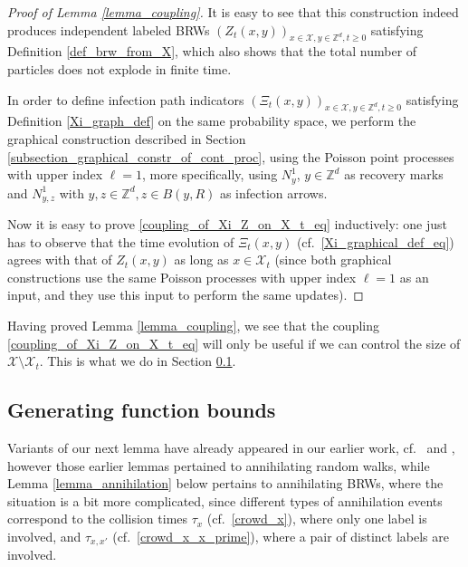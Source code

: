 \documentclass[a4paper,12pt]{article}
\begin{document}
\begin{proof}[Proof of Lemma \ref{lemma_coupling}]
\smallskip

It is easy to see that this construction indeed produces independent labeled BRWs  $(Z_t(x,y))_{x \in \mathcal{X},y \in \mathbb{Z}^d, t \geq 0}$ satisfying Definition \ref{def_brw_from_X}, which
also shows that the total number of particles does not explode in finite time.


\smallskip

 In order to define infection path indicators $(\Xi_t(x,y))_{x \in \mathcal{X},y \in \mathbb{Z}^d, t \geq 0}$ satisfying Definition \ref{Xi_graph_def} on the same probability space, we perform the graphical
 construction described in Section \ref{subsection_graphical_constr_of_cont_proc}, using the Poisson point processes with upper index $\ell=1$, more specifically, using  $N^{1}_y$, $y \in \mathbb{Z}^d$ as recovery marks and
 $N^{1}_{y,z}$ with $y,z \in \mathbb{Z}^d, z \in B(y,R)$ as infection arrows.

 \smallskip

 Now it is easy to prove \eqref{coupling_of_Xi_Z_on_X_t_eq} inductively: one just has to observe that the time evolution of $\Xi_t(x,y)$ (cf.\ \eqref{Xi_graphical_def_eq})
 agrees with that of $Z_t(x,y)$ as long as $x \in \mathcal{X}_t$ (since both graphical constructions use the same Poisson processes with upper index $\ell=1$ as an input, and they use this input to perform the same updates).
\end{proof}



Having proved Lemma \ref{lemma_coupling}, we see that the coupling \eqref{coupling_of_Xi_Z_on_X_t_eq} will only be useful if we can control the size of $\mathcal{X} \setminus \mathcal{X}_t$.
This is what we do in Section \ref{subsection_annihilating_lemma}.









\subsection{Generating function bounds}
\label{subsection_annihilating_lemma}

Variants of our next lemma have already appeared in our earlier work, cf.\ \cite[(5.14)]{RV15} and \cite[Lemma 2.4]{RV17}, however
those earlier lemmas pertained to annihilating random walks, while Lemma \ref{lemma_annihilation} below pertains to annihilating BRWs,
where the situation is a bit more complicated, since different types of annihilation events correspond to the collision times $\tau_x$ (cf.\ \eqref{crowd_x}), where only one label is involved,
and $\tau_{x,x'}$ (cf.\ \eqref{crowd_x_x_prime}), where a pair of distinct labels are involved.
\end{document}
